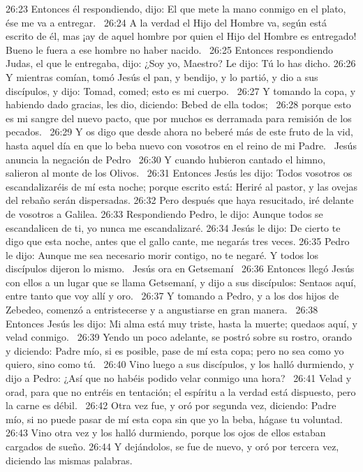 26:23 Entonces él respondiendo, dijo: El que mete la mano conmigo en el plato, ése me va a entregar.  
26:24 A la verdad el Hijo del Hombre va, según está escrito de él, mas ¡ay de aquel hombre por quien el Hijo del Hombre es entregado! Bueno le fuera a ese hombre no haber nacido.  
26:25 Entonces respondiendo Judas, el que le entregaba, dijo: ¿Soy yo, Maestro? Le dijo: Tú lo has dicho. 
26:26 Y mientras comían, tomó Jesús el pan, y bendijo, y lo partió, y dio a sus discípulos, y dijo: Tomad, comed; esto es mi cuerpo.  
26:27 Y tomando la copa, y habiendo dado gracias, les dio, diciendo: Bebed de ella todos;  
26:28 porque esto es mi sangre del nuevo pacto, que por muchos es derramada para remisión de los pecados.  
26:29 Y os digo que desde ahora no beberé más de este fruto de la vid, hasta aquel día en que lo beba nuevo con vosotros en el reino de mi Padre.  
Jesús anuncia la negación de Pedro   
26:30 Y cuando hubieron cantado el himno, salieron al monte de los Olivos.  
26:31 Entonces Jesús les dijo: Todos vosotros os escandalizaréis de mí esta noche; porque escrito está: Heriré al pastor, y las ovejas del rebaño serán dispersadas. 
26:32 Pero después que haya resucitado, iré delante de vosotros a Galilea. 
26:33 Respondiendo Pedro, le dijo: Aunque todos se escandalicen de ti, yo nunca me escandalizaré. 
26:34 Jesús le dijo: De cierto te digo que esta noche, antes que el gallo cante, me negarás tres veces. 
26:35 Pedro le dijo: Aunque me sea necesario morir contigo, no te negaré. Y todos los discípulos dijeron lo mismo.  
Jesús ora en Getsemaní   
26:36 Entonces llegó Jesús con ellos a un lugar que se llama Getsemaní, y dijo a sus discípulos: Sentaos aquí, entre tanto que voy allí y oro.  
26:37 Y tomando a Pedro, y a los dos hijos de Zebedeo, comenzó a entristecerse y a angustiarse en gran manera.  
26:38 Entonces Jesús les dijo: Mi alma está muy triste, hasta la muerte; quedaos aquí, y velad conmigo.  
26:39 Yendo un poco adelante, se postró sobre su rostro, orando y diciendo: Padre mío, si es posible, pase de mí esta copa; pero no sea como yo quiero, sino como tú.  
26:40 Vino luego a sus discípulos, y los halló durmiendo, y dijo a Pedro: ¿Así que no habéis podido velar conmigo una hora?  
26:41 Velad y orad, para que no entréis en tentación; el espíritu a la verdad está dispuesto, pero la carne es débil.  
26:42 Otra vez fue, y oró por segunda vez, diciendo: Padre mío, si no puede pasar de mí esta copa sin que yo la beba, hágase tu voluntad.  
26:43 Vino otra vez y los halló durmiendo, porque los ojos de ellos estaban cargados de sueño. 
26:44 Y dejándolos, se fue de nuevo, y oró por tercera vez, diciendo las mismas palabras.  
